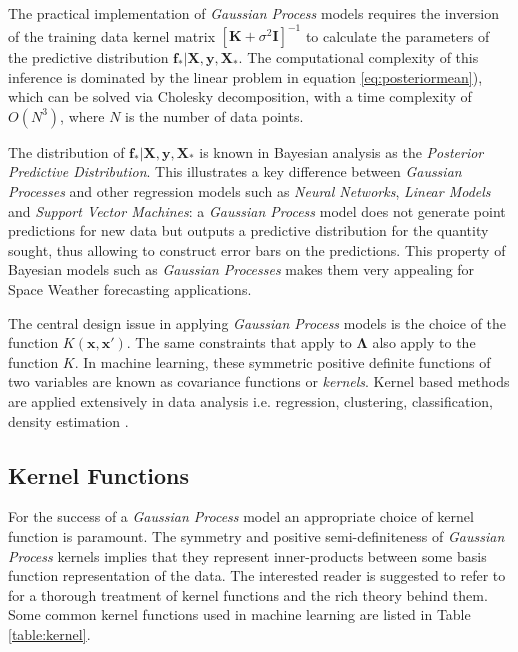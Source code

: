 The practical implementation of \emph{Gaussian Process} models requires the inversion of the training data kernel matrix $[\mathbf{K} + \sigma^{2} \mathbf{I}]^{-1}$ to calculate the parameters of the predictive distribution $\mathbf{f_*}|\mathbf{X},\mathbf{y},\mathbf{X_*}$. The computational complexity of this inference is dominated by the linear problem in equation \ref{eq:posteriormean}), which can be solved via Cholesky decomposition, with a time complexity of $O(N^3)$, where $N$ is the number of data points.

The distribution of $\mathbf{f_*}| \mathbf{X},\mathbf{y},\mathbf{X_*}$ is known in Bayesian analysis as the \emph{Posterior Predictive Distribution}. This illustrates a key difference between \emph{Gaussian Processes} and other regression models such as \emph{Neural Networks}, \emph{Linear Models} and \emph{Support Vector Machines}: a \emph{Gaussian Process} model does not generate point predictions for new data but outputs a predictive distribution for the quantity sought, thus allowing to construct error bars on the predictions. This property of Bayesian models such as \emph{Gaussian Processes} makes them very appealing for Space Weather forecasting applications. 

The central design issue in applying \emph{Gaussian Process} models is the choice of the function 
$K(\mathbf{x}, \mathbf{x}')$. The same constraints that apply to $\mathbf{\Lambda}$ also apply to the 
function $K$. In machine learning, these symmetric positive definite functions of two variables are known as 
covariance functions or \emph{kernels}. Kernel based methods are applied extensively in data analysis 
i.e. regression, clustering, classification, density estimation \citep{Scholkopf:2001:LKS:559923,hofmann2008}.

\subsection{Kernel Functions}

For the success of a \emph{Gaussian Process} model an appropriate choice of kernel function is paramount. The symmetry and positive semi-definiteness of \emph{Gaussian Process} kernels implies that they represent inner-products between some basis function representation of the data. The interested reader is suggested to refer to \citet{Berlinet2004,Scholkopf:2001:LKS:559923,hofmann2008} for a thorough treatment of kernel functions and the rich theory behind them. Some common kernel functions used in machine learning are listed in Table \ref{table:kernel}. 

